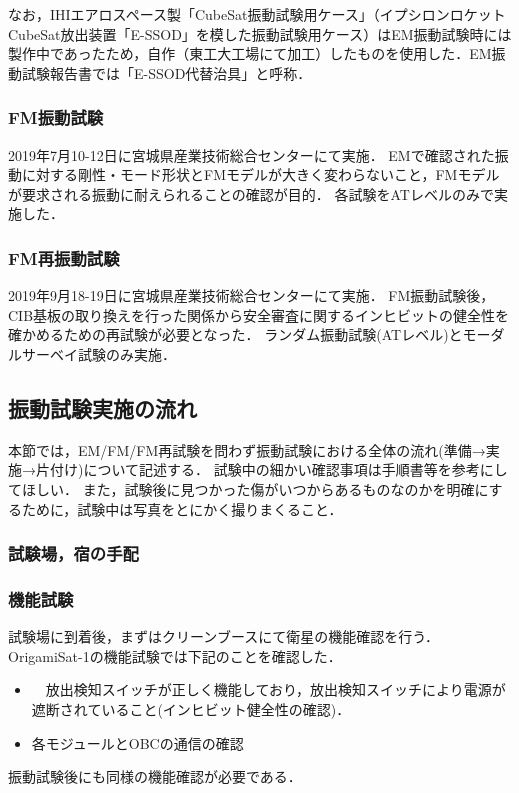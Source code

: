なお，IHIエアロスペース製「CubeSat振動試験用ケース」（イプシロンロケットCubeSat放出装置「E-SSOD」を模した振動試験用ケース）はEM振動試験時には製作中であったため，自作（東工大工場にて加工）したものを使用した．EM振動試験報告書では「E-SSOD代替治具」と呼称．


\subsubsection{FM振動試験}
2019年7月10-12日に宮城県産業技術総合センターにて実施．
EMで確認された振動に対する剛性・モード形状とFMモデルが大きく変わらないこと，FMモデルが要求される振動に耐えられることの確認が目的．
各試験をATレベルのみで実施した．

\subsubsection{FM再振動試験}
2019年9月18-19日に宮城県産業技術総合センターにて実施．
FM振動試験後，CIB基板の取り換えを行った関係から安全審査に関するインヒビットの健全性を確かめるための再試験が必要となった．
ランダム振動試験(ATレベル)とモーダルサーベイ試験のみ実施．

\subsection{振動試験実施の流れ}
本節では，EM/FM/FM再試験を問わず振動試験における全体の流れ(準備→実施→片付け)について記述する．
試験中の細かい確認事項は手順書\cite{FM_vibration_test_plan}等を参考にしてほしい．
また，試験後に見つかった傷がいつからあるものなのかを明確にするために，試験中は写真をとにかく撮りまくること．

\subsubsection{試験場，宿の手配}


\subsubsection{機能試験}
試験場に到着後，まずはクリーンブースにて衛星の機能確認を行う．
OrigamiSat-1の機能試験では下記のことを確認した．
\begin{itemize}
	\item　放出検知スイッチが正しく機能しており，放出検知スイッチにより電源が遮断されていること(インヒビット健全性の確認)．
	\item 各モジュールとOBCの通信の確認
\end{itemize}
振動試験後にも同様の機能確認が必要である．


